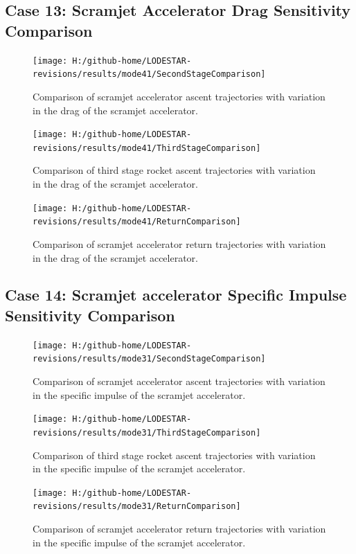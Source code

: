 \subsection{Case 13: Scramjet Accelerator Drag Sensitivity Comparison}\label{sec:app_comparison41}
\begin{figure}[!th]
\centering
\texttt{[image: H:/github-home/LODESTAR-revisions/results/mode41/SecondStageComparison]}
\caption{Comparison of scramjet accelerator ascent trajectories with variation in the drag of the scramjet accelerator.}
\label{fig:SecondStageComparison11}
\end{figure}
\begin{figure}[!th]
\centering
\texttt{[image: H:/github-home/LODESTAR-revisions/results/mode41/ThirdStageComparison]}
\caption{Comparison of third stage rocket ascent trajectories with variation in the drag of the scramjet accelerator.}
\label{fig:ThirdStageComparison11}
\end{figure}
\begin{figure}[!th]
\centering
\texttt{[image: H:/github-home/LODESTAR-revisions/results/mode41/ReturnComparison]}
\caption{Comparison of scramjet accelerator return trajectories with variation in the drag of the scramjet accelerator.}
\label{fig:ReturnComparison11}
\end{figure}
\FloatBarrier
\clearpage
\subsection{Case 14: Scramjet accelerator Specific Impulse Sensitivity Comparison}\label{sec:app_comparison31}
\begin{figure}[!th]
	\centering
	\texttt{[image: H:/github-home/LODESTAR-revisions/results/mode31/SecondStageComparison]}
	\caption{Comparison of scramjet accelerator ascent trajectories with variation in the specific impulse of the scramjet accelerator.}
	\label{fig:SecondStageComparison10}
\end{figure}
\begin{figure}[!th]
	\centering
	\texttt{[image: H:/github-home/LODESTAR-revisions/results/mode31/ThirdStageComparison]}
	\caption{Comparison of third stage rocket ascent trajectories with variation in the specific impulse of the scramjet accelerator.}
	\label{fig:ThirdStageComparison10}
\end{figure}
\begin{figure}[!th]
	\centering
	\texttt{[image: H:/github-home/LODESTAR-revisions/results/mode31/ReturnComparison]}
	\caption{Comparison of scramjet accelerator return trajectories with variation in the specific impulse of the scramjet accelerator.}
	\label{fig:ReturnComparison10}
\end{figure}
\FloatBarrier
\clearpage
